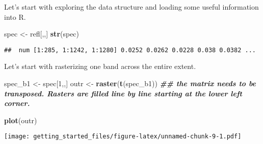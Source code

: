 \documentclass[
]{article}
\newenvironment{Shaded}{\begin{snugshade}}{\end{snugshade}}
\newcommand{\AttributeTok}[1]{\textcolor[rgb]{0.13,0.29,0.53}{#1}}
\newcommand{\DecValTok}[1]{\textcolor[rgb]{0.00,0.00,0.81}{#1}}
\newcommand{\DocumentationTok}[1]{\textcolor[rgb]{0.56,0.35,0.01}{\textbf{\textit{#1}}}}
\newcommand{\FunctionTok}[1]{\textcolor[rgb]{0.13,0.29,0.53}{\textbf{#1}}}
\newcommand{\NormalTok}[1]{#1}
\newcommand{\OtherTok}[1]{\textcolor[rgb]{0.56,0.35,0.01}{#1}}
\newcommand{\SpecialCharTok}[1]{\textcolor[rgb]{0.81,0.36,0.00}{\textbf{#1}}}
\newcommand{\StringTok}[1]{\textcolor[rgb]{0.31,0.60,0.02}{#1}}
\begin{document}
Let's start with exploring the data structure and loading some useful
information into R.

\begin{Shaded}
\begin{Highlighting}[]
\NormalTok{spec }\OtherTok{\textless{}{-}}\NormalTok{ refl[,,]}
\FunctionTok{str}\NormalTok{(spec) }
\end{Highlighting}
\end{Shaded}

\begin{verbatim}
##  num [1:285, 1:1242, 1:1280] 0.0252 0.0262 0.0228 0.038 0.0382 ...
\end{verbatim}

\begin{Shaded}
\end{Shaded}

Let's start with rasterizing one band across the entire extent.

\begin{Shaded}
\begin{Highlighting}[]
\NormalTok{spec\_b1 }\OtherTok{\textless{}{-}}\NormalTok{ spec[}\DecValTok{1}\NormalTok{,,]}
\NormalTok{outr }\OtherTok{\textless{}{-}} \FunctionTok{raster}\NormalTok{(}\FunctionTok{t}\NormalTok{(spec\_b1)) }\DocumentationTok{\#\# the matrix needs to be transposed. Rasters are filled line by line starting at the lower left corner.}

\FunctionTok{plot}\NormalTok{(outr)}
\end{Highlighting}
\end{Shaded}

\texttt{[image: getting\_started\_files/figure-latex/unnamed-chunk-9-1.pdf]}
\end{document}
